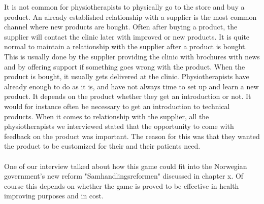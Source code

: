 It is not common for physiotherapists to physically go to the store and buy a product. An already established relationship with a supplier is the most common channel where new products are bought. Often after buying a product, the supplier will contact the clinic later with improved or new products. It is quite normal to maintain a relationship with the supplier after a product is bought. This is usually done by the supplier providing the clinic with brochures with news and by offering support if something goes wrong with the product. When the product is bought, it usually gets delivered at the clinic. Physiotherapists have already enough to do as it is, and have not always time to set up and learn a new product. It depends on the product whether they get an introduction or not. It would for instance often be necessary to get an introduction to technical products. When it comes to relationship with the supplier, all the physiotherapists we interviewed stated that the opportunity to come with feedback on the product was important. The reason for this was that they wanted the product to be customized for their and their patients need. \\ \\
One of our interview talked about how this game could fit into the Norwegian government’s new reform "Samhandlingsreformen" discussed in chapter x. Of course this depends on whether the game is proved to be effective in health improving purposes and in cost.  \\ \\
